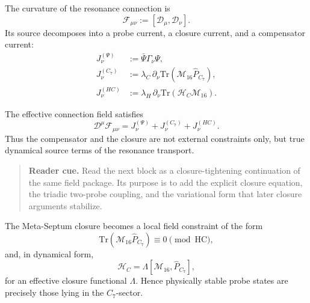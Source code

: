 \begin{definition}
The curvature of the resonance connection is
\[
  \mathcal F_{\mu\nu} := [\mathcal D_\mu,\mathcal D_\nu].
\]
Its source decomposes into a probe current, a closure current, and a
compensator current:
\begin{align*}
  J^{(\Psi)}_\nu &:= \bar\Psi\Gamma_\nu\Psi,\\
  J^{(C_7)}_\nu &:= \lambda_C\,\partial_\nu
    \mathrm{Tr}(\mathcal M_{16}\hat P_{C_7}),\\
  J^{(HC)}_\nu &:= \lambda_H\,\partial_\nu
    \mathrm{Tr}(\mathcal H_C\mathcal M_{16}).
\end{align*}
\end{definition}

\begin{theorem}
\label{thm:resonance-field-eq}
The effective connection field satisfies
\[
  \mathcal D^\mu\mathcal F_{\mu\nu}
  =
  J^{(\Psi)}_\nu + J^{(C_7)}_\nu + J^{(HC)}_\nu.
\]
Thus the compensator and the closure are not external constraints only,
but true dynamical source terms of the resonance transport.
\end{theorem}

\begin{quote}\small
\noindent\textbf{Reader cue.} Read the next block as a closure-tightening continuation of the same field package. Its purpose is to add the explicit closure equation, the triadic two-probe coupling, and the variational form that later closure arguments stabilize.
\end{quote}

\begin{proposition}
\label{prop:closure-equation}
The Meta-Septum closure becomes a local field constraint of the form
\[
  \mathrm{Tr}(\mathcal M_{16}\hat P_{C_7})
  \equiv 0 \pmod{\mathrm{HC}},
\]
and, in dynamical form,
\[
  \mathcal H_C = \Lambda[\mathcal M_{16},\hat P_{C_7}],
\]
for an effective closure functional $\Lambda$.
Hence physically stable probe states are precisely those lying in the
$C_7$-sector.
\end{proposition}

